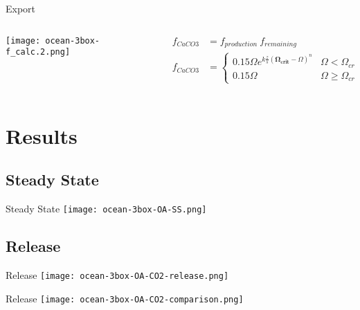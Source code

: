 \documentclass[aspectratio=169]{beamer}
\begin{document}
\begin{frame}{Export}
    \begin{columns}
        \begin{column}{0.45\linewidth}
            \centering
            \texttt{[image: ocean-3box-f\_calc.2.png]}
        \end{column}
        \begin{column}{0.55\linewidth}
            \begin{align*}
                f_{CaCO3} &= f_{production} ~ f_{remaining} \\
                f_{CaCO3} &= \begin{cases}
                    0.15 \Omega e^{k \frac{z}{s} (\mathbf{\Omega_{crit}} - \Omega)^n} & \Omega < \Omega_{crit} \\
                    0.15 \Omega & \Omega \geq \Omega_{crit}
                \end{cases}
            \end{align*}
        \end{column}
    \end{columns}
\end{frame}

\section{Results}

\subsection{Steady State}

\begin{frame}{Steady State}
    \centering
    \texttt{[image: ocean-3box-OA-SS.png]}

\end{frame}

\subsection{ Release}

\begin{frame}{ Release}
    \centering
    \texttt{[image: ocean-3box-OA-CO2-release.png]}
\end{frame}

\begin{frame}{ Release}
    \centering
    \texttt{[image: ocean-3box-OA-CO2-comparison.png]}
\end{frame}
\end{document}
